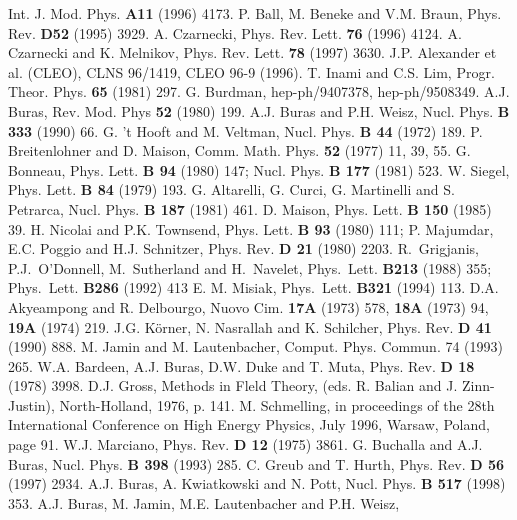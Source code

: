 \begin{thebibliography}{999}
{ Int. J. Mod. Phys.} {\bf A11} (1996) 4173.
{P. Ball, M. Beneke and V.M. Braun,} 
{ Phys. Rev.} {\bf D52} (1995) 3929.
A. Czarnecki, { Phys. Rev. Lett.} {\bf 76} (1996) 4124.
A. Czarnecki and K. Melnikov, 
{ Phys. Rev. Lett.} {\bf 78} (1997) 3630.
{J.P. Alexander} et al. (CLEO), CLNS 96/1419, CLEO 96-9 (1996).
{ T. Inami and C.S. Lim,}
{ Progr. Theor. Phys.} {\bf 65} (1981) 297.
G. Burdman, hep-ph/9407378, hep-ph/9508349.
A.J. Buras,
{ Rev. Mod. Phys} {\bf 52} (1980) 199.
{ A.J. Buras and P.H. Weisz,}
{ Nucl. Phys.} {\bf B 333} (1990) 66.
{ G. 't Hooft and M. Veltman},
{ Nucl. Phys.} {\bf B 44} (1972) 189.
{ P. Breitenlohner and D. Maison,} { Comm. Math. Phys.}
{\bf 52} (1977) 11, 39, 55.
G. Bonneau, { Phys. Lett.} {\bf B 94} (1980) 147;
{ Nucl. Phys.} {\bf B 177} (1981) 523.
W. Siegel, { Phys. Lett.} {\bf B 84} (1979) 193.
{ G. Altarelli, G. Curci, G. Martinelli and S. Petrarca,}
{ Nucl. Phys.} {\bf B 187} (1981) 461.
D. Maison, { Phys. Lett.} {\bf B 150} (1985) 39.
H. Nicolai and P.K. Townsend, { Phys. Lett.} {\bf B 93} (1980) 111;
P. Majumdar, E.C. Poggio and H.J. Schnitzer, 
{ Phys. Rev.} {\bf D 21} (1980) 2203.
{ R.~Grigjanis, P.J.~O'Donnell, M.~Sutherland and H.~Navelet,} 
{ Phys.~Lett.} {\bf B213} (1988) 355;
{ Phys.~Lett.} {\bf B286} (1992) 413 E.
M. Misiak, { Phys.~Lett.} {\bf B321} (1994) 113.
{ D.A. Akyeampong and R. Delbourgo}, { Nuovo Cim.}
{\bf 17A} (1973) 578, {\bf 18A} (1973) 94, {\bf 19A} (1974) 219.
J.G. K\"orner, N. Nasrallah and K. Schilcher, 
{ Phys. Rev.} {\bf D 41} (1990) 888.
M. Jamin and M. Lautenbacher, Comput. Phys. Commun. 74 (1993) 265.
{ W.A. Bardeen, A.J. Buras, D.W. Duke and T. Muta},
{ Phys. Rev.} {\bf D 18} (1978) 3998.
D.J. Gross,  Methods in Fleld Theory, (eds. R. Balian and J. Zinn-Justin),
North-Holland, 1976, p. 141.
{ M. Schmelling}, in proceedings of the 28th International Conference
on High Energy Physics, July 1996, Warsaw, Poland, page 91.
W.J. Marciano, { Phys. Rev.} {\bf D 12} (1975) 3861.
{ G. Buchalla and A.J. Buras,}
{ Nucl. Phys.} {\bf B 398} (1993) 285.
{ C. Greub and T. Hurth,} { Phys. Rev.} {\bf D 56} (1997) 2934.
A.J. Buras, A. Kwiatkowski and N. Pott,
{ Nucl. Phys.} {\bf B 517} (1998) 353. 
{ A.J. Buras, M. Jamin, M.E. Lautenbacher and P.H. Weisz,}

\end{thebibliography}
